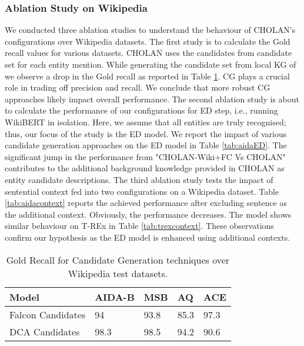 \documentclass[11pt,a4paper]{article}
\begin{document}
\subsubsection{Ablation Study on Wikipedia}
We conducted three ablation studies to understand the behaviour of CHOLAN's configurations over Wikipedia datasets. The first study is to calculate the Gold recall values for various datasets. CHOLAN uses the candidates from  candidate set for each entity mention. While generating the candidate set from local KG of \cite{DBLP:conf/naacl/SakorMSSV0A19}
we observe a drop in the Gold recall as reported in Table \ref{tab:recall}. 
CG plays a crucial role in trading off precision and recall. We conclude that more robust CG approaches likely impact overall performance. The second ablation study is about to calculate the performance of our configurations for ED step, i.e., running WikiBERT in isolation. Here, we assume that all entities are truly recognised; thus, our focus of the study is the ED model. We report the impact of various candidate generation approaches on the ED model in Table \ref{tab:aidaED}. The significant jump in the performance from "CHOLAN-Wiki+FC Vs CHOLAN" contributes to the additional background knowledge provided in CHOLAN as entity candidate descriptions. 
The third ablation study tests the impact of sentential context fed into two configurations on a Wikipedia dataset. Table \ref{tab:aidacontext} reports the achieved performance after excluding sentence as the additional context. Obviously, the performance decreases. The model shows similar behaviour on T-REx in Table \ref{tab:trexcontext}. These observations confirm our hypothesis as the ED model is enhanced using additional contexts.


\begin{table}[!htp]
    \centering
    \begin{tabular}{p{2.6cm}p{1.2cm}p{0.6cm}p{0.6cm}p{0.6cm} }
\toprule
     \textbf{Model} & \textbf{AIDA-B} & \textbf{MSB} & \textbf{AQ} & \textbf{ACE}\\
\midrule
      Falcon Candidates &94& 93.8  &85.3 &97.3\\
      DCA  Candidates & 98.3&  98.5 & 94.2 &90.6\\
\bottomrule
    \end{tabular}
    \caption{Gold Recall for Candidate Generation techniques over Wikipedia test datasets.}
    \label{tab:recall}
    \vspace{-2mm}
\end{table}
\end{document}
